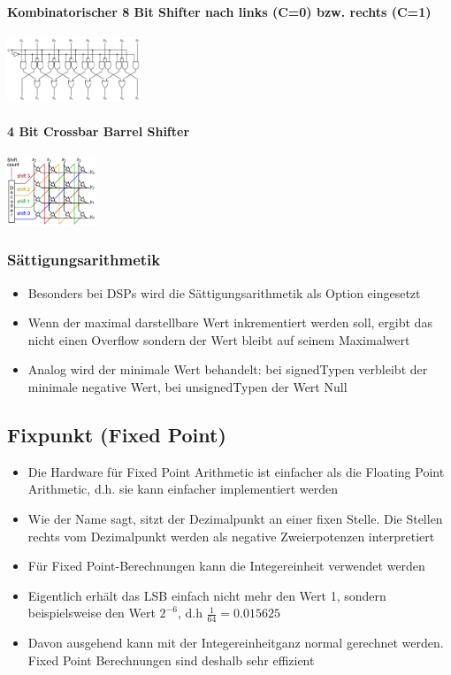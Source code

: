 \begin{multicols}{2}
	\paragraph{Kombinatorischer 8 Bit Shifter nach links (C=0) bzw. rechts (C=1)}
	\includegraphics[width=0.3\textwidth]{images/Arithmetik/Shifter_1}

	\paragraph{4 Bit Crossbar Barrel Shifter}
	\includegraphics[width=0.2\textwidth]{images/Arithmetik/Shifter_2}
\end{multicols}

\subsubsection{Sättigungsarithmetik}
\begin{itemize}
	\item Besonders bei DSPs wird die Sättigungsarithmetik als Option eingesetzt 
	\item Wenn der maximal darstellbare Wert inkrementiert werden soll, ergibt das nicht einen Overflow sondern der Wert bleibt auf seinem Maximalwert 
	\item Analog wird der minimale Wert behandelt: bei signedTypen verbleibt der minimale negative Wert, bei unsignedTypen der Wert Null
\end{itemize}

\subsection{Fixpunkt (Fixed Point)}
\begin{itemize}
	\item Die Hardware für Fixed Point Arithmetic ist einfacher als die Floating Point Arithmetic, d.h. sie kann einfacher implementiert werden
	\item Wie der Name sagt, sitzt der Dezimalpunkt an einer fixen Stelle. Die Stellen rechts vom Dezimalpunkt werden als negative Zweierpotenzen interpretiert
	\item  Für Fixed Point-Berechnungen kann die Integereinheit verwendet werden
	\item Eigentlich erhält das LSB einfach nicht mehr den Wert 1, sondern beispielsweise den Wert $2^{-6}$, d.h $\frac{1}{64} = 0.015625$
	\item  Davon ausgehend kann mit der Integereinheitganz normal gerechnet werden. 
	Fixed Point Berechnungen sind deshalb sehr effizient
\end{itemize}

